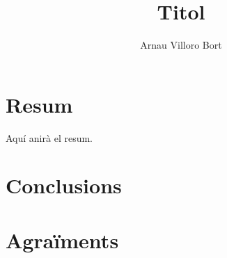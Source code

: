 \documentclass{book}
\title{Titol}
\author{Arnau Villoro Bort}
\begin{document}
\frontmatter




\chapter*{Resum} \label{sec:Resum}
Aquí anirà el resum.

\tableofcontents





\mainmatter







\chapter{Conclusions}
\chapter{Agraïments}


\end{document}

